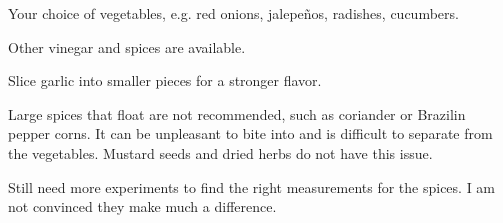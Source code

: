 \begin{variation}
\item Your choice of vegetables, e.g. red onions, jalepe\~{n}os, radishes, cucumbers.

\item Other vinegar and spices are available.

\item Slice garlic into smaller pieces for a stronger flavor.
\end{variation}


\begin{experiments}
\item Large spices that float are not recommended, such as coriander or Brazilin pepper corns.
	It can be unpleasant to bite into and is difficult to separate from the vegetables.
	Mustard seeds and dried herbs do not have this issue.
\item Still need more experiments to find the right measurements for the spices.
	I am not convinced they make much a difference.
\end{experiments}

\recipeend

